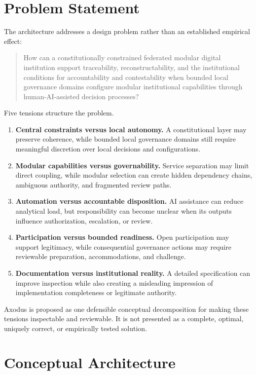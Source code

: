 \documentclass[11pt]{article}
\begin{document}
\section{Problem Statement}

The architecture addresses a design problem rather than an established
empirical effect:

\begin{quote}
How can a constitutionally constrained federated modular digital institution
support traceability, reconstructability, and the institutional conditions
for accountability and contestability when bounded local governance domains
configure modular institutional capabilities through human-AI-assisted
decision processes?
\end{quote}

Five tensions structure the problem.

\begin{enumerate}
\item \textbf{Central constraints versus local autonomy.} A constitutional
layer may preserve coherence, while bounded local governance domains still
require meaningful discretion over local decisions and configurations.
\item \textbf{Modular capabilities versus governability.} Service separation
may limit direct coupling, while modular selection can create hidden
dependency chains, ambiguous authority, and fragmented review paths.
\item \textbf{Automation versus accountable disposition.} AI assistance can
reduce analytical load, but responsibility can become unclear when its
outputs influence authorization, escalation, or review.
\item \textbf{Participation versus bounded readiness.} Open participation may
support legitimacy, while consequential governance actions may require
reviewable preparation, accommodations, and challenge.
\item \textbf{Documentation versus institutional reality.} A detailed
specification can improve inspection while also creating a misleading
impression of implementation completeness or legitimate authority.
\end{enumerate}

Axodus is proposed as one defensible conceptual decomposition for making these
tensions inspectable and reviewable. It is not presented as a complete,
optimal, uniquely correct, or empirically tested solution.

\section{Conceptual Architecture}
\end{document}
